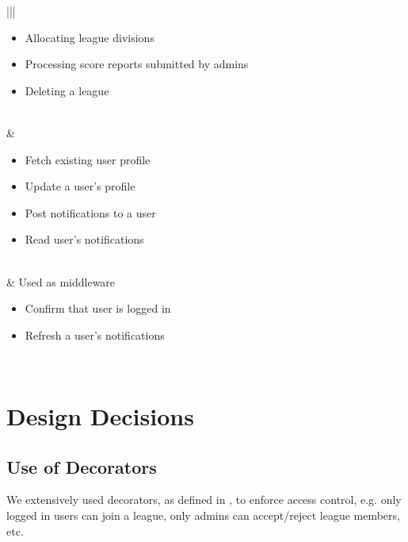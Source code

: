 \documentclass[letterpaper,10pt,english]{sphinxmanual}
\begin{document}
\begin{savenotes}
\begin{tabular}[t]{|*{2}{|}}
\begin{itemize}
\item {} 
Allocating league divisions

\item {} 
Processing score reports submitted by admins

\item {} 
Deleting a league

\end{itemize}
\\
\hline
{\hyperref[\detokenize{tiger_leagues/readme:module-tiger_leagues.user}]{}}
&\begin{itemize}
\item {} 
Fetch existing user profile

\item {} 
Update a user’s profile

\item {} 
Post notifications to a user

\item {} 
Read user’s notifications

\end{itemize}
\\
\hline
{\hyperref[\detokenize{tiger_leagues/readme:module-tiger_leagues.decorators}]{}}
&
Used as middleware
\begin{itemize}
\item {} 
Confirm that user is logged in

\item {} 
Refresh a user’s notifications

\end{itemize}
\\
\hline
\end{tabular}
\par
\sphinxattableend\end{savenotes}


\section{Design Decisions}
\label{\detokenize{tiger_leagues/readme:design-decisions}}\label{\detokenize{tiger_leagues/readme:controllers-design-decisions}}

\subsection{Use of Decorators}
\label{\detokenize{tiger_leagues/readme:use-of-decorators}}\label{\detokenize{tiger_leagues/readme:id1}}
We extensively used decorators, as defined in
{\hyperref[\detokenize{tiger_leagues/readme:module-tiger_leagues.decorators}]{}}, to enforce access control, e.g. only
logged in users can join a league, only admins can accept/reject league
members, etc.
\end{document}
